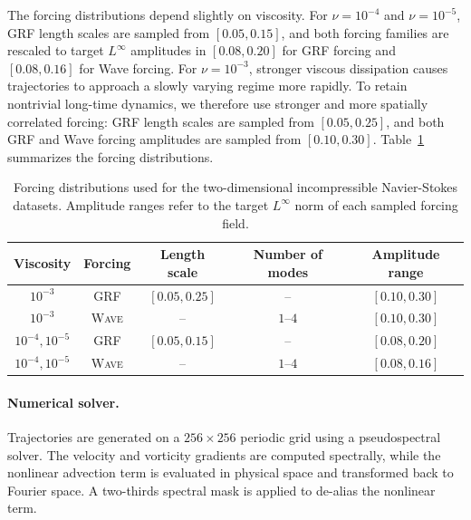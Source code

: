 \documentclass[11pt]{article}
\begin{document}
The forcing distributions depend slightly on viscosity. For
$\nu=10^{-4}$ and $\nu=10^{-5}$, GRF length scales are sampled from $[0.05,0.15]$, and both forcing families are rescaled to target $L^\infty$ amplitudes in $[0.08,0.20]$ for GRF forcing and $[0.08,0.16]$ for Wave forcing. For $\nu=10^{-3}$, stronger viscous dissipation causes trajectories to approach a slowly varying regime more rapidly. To retain nontrivial long-time dynamics, we therefore use stronger and more spatially correlated forcing: GRF length scales are sampled from $[0.05,0.25]$, and both GRF and Wave forcing amplitudes are sampled from $[0.10,0.30]$. Table~\ref{tab:ns2d_forcing_settings} summarizes the forcing
distributions.

\begin{table}[t]
    \centering
    \caption{
    Forcing distributions used for the two-dimensional incompressible Navier-Stokes datasets. Amplitude ranges refer to the target $L^\infty$ norm of each sampled forcing field.
    }
    \label{tab:ns2d_forcing_settings}
    \begin{tabular}{ccccc}
        \toprule
        Viscosity
        & Forcing
        & Length scale
        & Number of modes
        & Amplitude range \\
        \midrule
        $10^{-3}$
        & \textsc{GRF}
        & $[0.05,0.25]$
        & --
        & $[0.10,0.30]$ \\
        $10^{-3}$
        & \textsc{Wave}
        & --
        & $1$--$4$
        & $[0.10,0.30]$ \\
        $10^{-4},10^{-5}$
        & \textsc{GRF}
        & $[0.05,0.15]$
        & --
        & $[0.08,0.20]$ \\
        $10^{-4},10^{-5}$
        & \textsc{Wave}
        & --
        & $1$--$4$
        & $[0.08,0.16]$ \\
        \bottomrule
    \end{tabular}
\end{table}

\paragraph{Numerical solver.}
Trajectories are generated on a $256\times256$ periodic grid using a pseudospectral solver. The velocity and vorticity gradients are computed spectrally, while the nonlinear advection term is evaluated in physical space and transformed back to Fourier space. A two-thirds spectral mask is applied to de-alias the nonlinear term.
\end{document}
